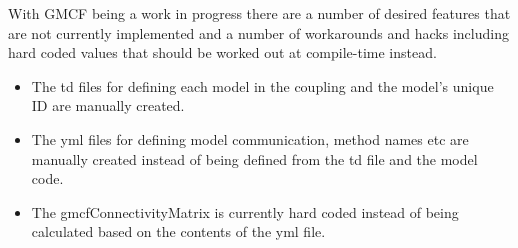 \documentclass{article}
\begin{document}
With GMCF being a work in progress there are a number of desired features that
are not currently implemented and a number of workarounds and hacks including
hard coded values that should be worked out at compile-time instead.

\begin{itemize}
    \item The td files for defining each model in the coupling and the model's
    unique ID are manually created.
    \item The yml files for defining model communication, method names etc are
    manually created instead of being defined from the td file and the model
    code.
    \item The gmcfConnectivityMatrix is currently hard coded instead of being
    calculated based on the contents of the yml file.
\end{itemize}
\end{document}
